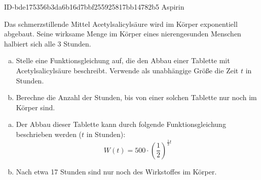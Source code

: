 \begin{exercise}
      {ID-bde175356b3da6b16d7bbf255925817bb14782b5}
      {Aspirin}
  \ifproblem\problem\par
    Das schmerzstillende Mittel Acetylsalicylsäure wird im Körper
    exponentiell abgebaut. Seine wirksame Menge im Körper eines
    nierengesunden Menschen halbiert sich alle 3 Stunden.
    \begin{enumerate}[a)]
      \item Stelle eine Funktionsgleichung auf, die den Abbau
            einer Tablette mit  Acetylsalicylsäure
            beschreibt. Verwende als unabhängige Größe die Zeit
            $t$ in Stunden.
      \item Berechne die Anzahl der Stunden, bis von einer
            solchen Tablette nur noch  im Körper sind.
    \end{enumerate}
  \fi
  \ifoutcome\outcome\par
    \begin{enumerate}[a)]
      \item Der Abbau dieser Tablette kann durch folgende
            Funktionsgleichung beschrieben werden ($t$ in Stunden):
            \begin{equation*}
              W(t)=500\cdot\left(\frac{1}{2}\right)^{\frac{1}{3}t}
            \end{equation*}
      \item Nach etwa \num{17} Stunden sind nur noch  des
            Wirkstoffes im Körper.
    \end{enumerate}
  \fi
\end{exercise}
